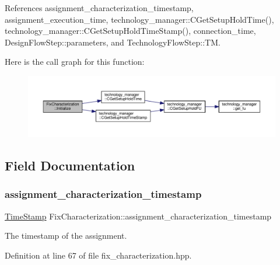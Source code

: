 References assignment\+\_\+characterization\+\_\+timestamp, assignment\+\_\+execution\+\_\+time, technology\+\_\+manager\+::\+C\+Get\+Setup\+Hold\+Time(), technology\+\_\+manager\+::\+C\+Get\+Setup\+Hold\+Time\+Stamp(), connection\+\_\+time, Design\+Flow\+Step\+::parameters, and Technology\+Flow\+Step\+::\+TM.

Here is the call graph for this function\+:
\nopagebreak
\begin{figure}[H]
\begin{center}
\leavevmode
\includegraphics[width=350pt]{d9/dc5/classFixCharacterization_a1abe993122a5f39bbabbe3e1fca6141d_cgraph}
\end{center}
\end{figure}


\subsection{Field Documentation}
\mbox{\label{classFixCharacterization_aad760e86f9c577a6d1ce006cdeb07595}} 
\subsubsection{\texorpdfstring{assignment\+\_\+characterization\+\_\+timestamp}{assignment\_characterization\_timestamp}}
{\footnotesize\ttfamily \hyperlink{structTimeStamp}{Time\+Stamp} Fix\+Characterization\+::assignment\+\_\+characterization\+\_\+timestamp\hspace{0.3cm}{\ttfamily [protected]}}



The timestamp of the assignment. 



Definition at line 67 of file fix\+\_\+characterization.\+hpp.



